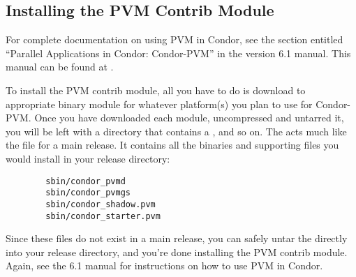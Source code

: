 \subsection{\label{sec:PVM-Install}
Installing the PVM Contrib Module} 

For complete documentation on using PVM in Condor, see the section
entitled ``Parallel Applications in Condor: Condor-PVM'' in the
version 6.1 manual.
This manual can be found at
.

To install the PVM contrib module, all you have to do is download
to appropriate binary module for whatever platform(s) you plan to use
for Condor-PVM.
Once you have downloaded each module, uncompressed and untarred it, you
will be left with a directory that contains a ,
 and so on.
The  acts much like the  file for a
main release. 
It contains all the binaries and supporting files you would install in
your release directory:
\begin{verbatim}
        sbin/condor_pvmd
        sbin/condor_pvmgs
        sbin/condor_shadow.pvm
        sbin/condor_starter.pvm
\end{verbatim}

Since these files do not exist in a main release, you can safely untar
the  directly into your release directory, and you're
done installing the PVM contrib module.
Again, see the 6.1 manual for instructions on how to use PVM in
Condor.

